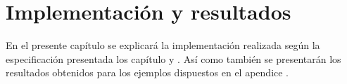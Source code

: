 \chapter{Implementación y resultados}\label{chapter:imp_y_res}

En el presente capítulo se explicará la implementación realizada según la 
especificación presentada los capítulo y . Así como
también se presentarán los resultados obtenidos para los ejemplos dispuestos en el apendice 
.

